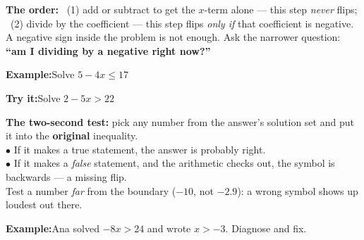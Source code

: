 \documentclass[12pt]{article}
\begin{document}

\begin{formulabox}
\textbf{The order:} \ (1) add or subtract to get the $x$-term alone --- this step
\emph{never} flips; \ (2) divide by the coefficient --- this step flips
\emph{only if} that coefficient is negative.\\[3pt]
A negative sign inside the problem is not enough. Ask the narrower question:
\textbf{``am I dividing by a negative right now?''}
\end{formulabox}

\begin{examplebox}
\textbf{Example:}\quad Solve $5 - 4x \le 17$
\end{examplebox}

\begin{tryitbox}
\textbf{Try it:}\quad Solve $2 - 5x > 22$\\[2pt]
\end{tryitbox}


\begin{formulabox}
\textbf{The two-second test:} pick any number from the answer's solution set and
put it into the \textbf{original} inequality.\\[2pt]
$\bullet$ If it makes a true statement, the answer is probably right.\\
$\bullet$ If it makes a \emph{false} statement, and the arithmetic checks out,
the symbol is backwards --- a missing flip.\\[3pt]
Test a number \emph{far} from the boundary ($-10$, not $-2.9$): a wrong symbol
shows up loudest out there.
\end{formulabox}

\begin{examplebox}
\textbf{Example:}\quad Ana solved $-8x > 24$ and wrote $x > -3$. Diagnose and fix.
\end{examplebox}
\end{document}
